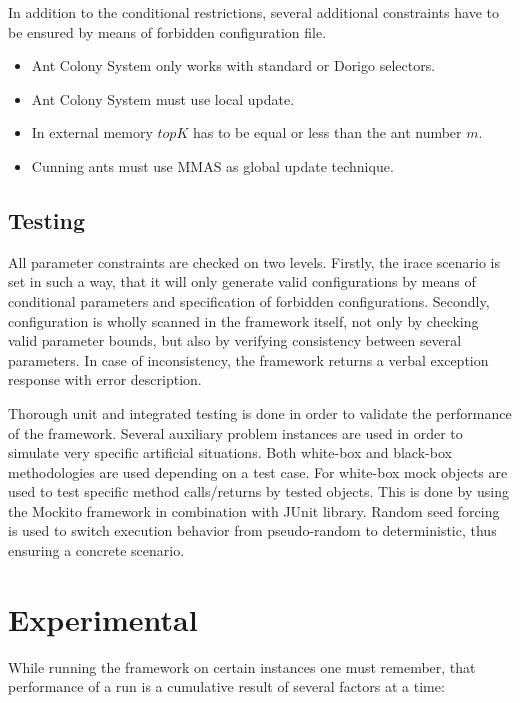 \documentclass[12pt,a4paper,oneside]{book}
\begin{document}
In addition to the conditional restrictions, several additional constraints have to be ensured by means of forbidden configuration file.

\begin{itemize}
\item Ant Colony System only works with standard or Dorigo selectors.

\item Ant Colony System must use local update.

\item In external memory $topK$ has to be equal or less than the ant number $m$.

\item Cunning ants must use MMAS as global update technique.
\end{itemize}


\section{Testing}


All parameter constraints are checked on two levels. Firstly, the irace scenario is set in such a way, that it will only generate valid configurations by means of conditional parameters and specification of forbidden configurations. Secondly, configuration is wholly scanned in the framework itself, not only by checking valid parameter bounds, but also by verifying consistency between several parameters. In case of inconsistency, the framework returns a verbal exception response with error description.

Thorough unit and integrated testing is done in order to validate the performance of the framework. Several auxiliary problem instances are used in order to simulate very specific artificial situations. Both white-box and black-box methodologies are used depending on a test case. For white-box mock objects are used to test specific method calls/returns by tested objects. This is done by using the Mockito framework in combination with JUnit library. Random seed forcing is used to switch execution behavior
from pseudo-random to deterministic, thus ensuring a concrete scenario.

\chapter{Experimental}

While running the framework on certain instances one must remember, that performance of a run is a cumulative result of several factors at a time: 
\end{document}
